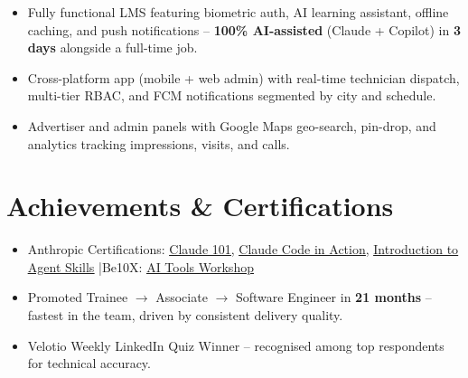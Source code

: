 \documentclass{resume}
\begin{document}
    \vspace{1pt}

    \begin{itemize}
      \item Fully functional LMS featuring biometric auth, AI learning assistant, offline caching, and push notifications -- \textbf{100\% AI-assisted} (Claude + Copilot) in \textbf{3 days} alongside a full-time job.
    \end{itemize}
    
    \vspace{1pt}

    \begin{itemize}
      \item Cross-platform app (mobile + web admin) with real-time technician dispatch, multi-tier RBAC, and FCM notifications segmented by city and schedule.
    \end{itemize}
    
    \vspace{1pt}

    \begin{itemize}
      \item Advertiser and admin panels with Google Maps geo-search, pin-drop, and analytics tracking impressions, visits, and calls.
    \end{itemize}
    
    \section{Achievements \& Certifications}
    
    \begin{itemize}
      \item Anthropic Certifications: \href{https://verify.skilljar.com/c/738qqbw7mdzg}{\underline{Claude 101}}, \href{https://verify.skilljar.com/c/y7sjp6gizmbk}{\underline{Claude Code in Action}}, \href{https://verify.skilljar.com/c/yhi5c9jiyomj}{\underline{Introduction to Agent Skills}} \enspace|\enspace Be10X: \href{https://certx.in/certificate/0270772f-3809-4400-b29b-1e1c61cd09971132989}{\underline{AI Tools Workshop}}
      \item Promoted Trainee $\to$ Associate $\to$ Software Engineer in \textbf{21 months} -- fastest in the team, driven by consistent delivery quality.
      \item Velotio Weekly LinkedIn Quiz Winner -- recognised among top respondents for technical accuracy.
    \end{itemize}
    
\end{document}
